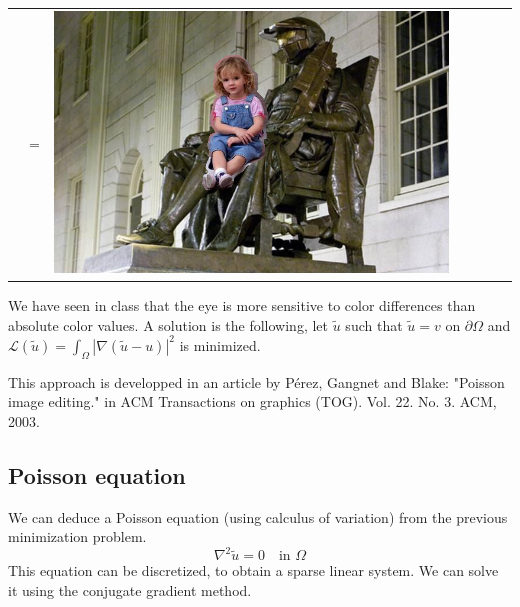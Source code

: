 \documentclass[a4paper]{article}
\begin{document}
\begin{tabular}{m{1.6cm}m{.6cm}m{1.6cm}m{.6cm}m{4.7cm}m{.6cm}m{4.7cm}}
    & {\Huge=} &
    \includegraphics[scale=.2]{results_poisson/naive.png}
  \end{tabular}
  
  \medskip We have seen in class that the eye is more sensitive to color differences than absolute color values. A solution is the following, let $\tilde u$ such that $\tilde u = v$ on $\partial\Omega$ and $\mathcal L(\tilde u) = \int_\Omega |\nabla(\tilde u - u)|^2$ is minimized.
  
  \medskip This approach is developped in an article by Pérez, Gangnet and Blake: "Poisson image editing." in ACM Transactions on graphics (TOG). Vol. 22. No. 3. ACM, 2003.
  

  
  \subsection{Poisson equation}
  
  We can deduce a Poisson equation (using calculus of variation) from the previous minimization problem. 
  \[\nabla^2 \tilde u = 0 \quad\text{in }\Omega\]
  This equation can be discretized, to obtain a sparse linear system. We can solve it using the conjugate gradient method.
  
\end{document}
